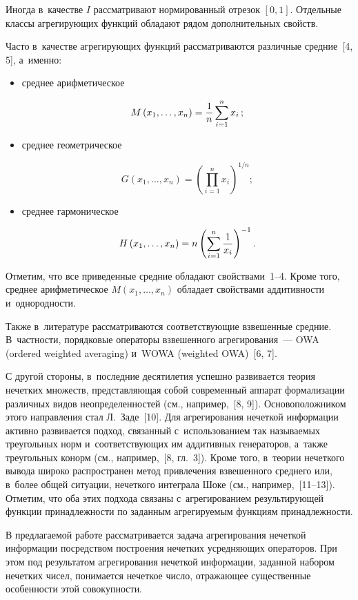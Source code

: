 \begin{multicols}{2}
Иногда в~качестве $I$ рассматривают нормированный отрезок $[0, 1]$. Отдельные 
классы агрегирующих функций обладают рядом дополнительных свойств.


Часто в~качестве агрегирующих функций рассматриваются различные средние~[4, 5], 
а~именно: 
\begin{itemize}

\item среднее арифметическое


\noindent
$$
M\left(x_1,\ldots, x_n\right) = \displaystyle\frac{\displaystyle 1\mathstrut}{\displaystyle n\mathstrut}\sum\limits_{i=1}^nx_i\,;
$$ 
\item
среднее геометрическое 

\noindent
$$
G\left(x_1,\ldots, x_n\right) = \left(\prod\limits_{i=1}^nx_i\right)^{1/n};
$$ 
\item среднее гармоническое 

\noindent
$$
H\left(x_1,\ldots, x_n\right) = n\left(\sum\limits_{i=1}^n \displaystyle\frac{\displaystyle 1\mathstrut}{\displaystyle x_i\mathstrut}\right)^{-1}.
$$  
\end{itemize}
Отметим, что все приведенные средние обладают свойствами~1--4. Кроме того, 
среднее арифметическое $M(x_1,\ldots, x_n)$ обладает  свойствами ад\-ди\-тив\-ности и~од\-но\-род\-ности.


Также в~литературе рассматриваются соответствующие взвешенные средние. 
В~част\-ности,  порядковые операторы взвешенного агрегирования~--- OWA 
(ordered weighted averaging) и~WOWA (weighted OWA)~[6, 7].

С другой стороны, в~последние десятилетия успешно развивается теория нечетких 
множеств, представляющая собой современный аппарат формализации различных видов 
неопределенностей (см., например,~[8, 9]). Основоположником этого направления стал 
Л.~Заде~[10].  Для агрегирования нечеткой информации активно развивается подход, 
связанный с~использованием так называемых треугольных норм и~соответствующих им 
аддитивных генераторов, а~также треугольных конорм (см., например,~[8, гл.~3]).   
Кроме того, в~тео\-рии нечеткого вывода широко распространен метод привлечения 
взвешенного среднего или, в~более общей ситуации, нечеткого интеграла Шоке (см., 
например,~[11--13]). Отметим, что оба этих подхода связаны с~агрегированием 
результирующей функции принадлежности  по заданным агрегируемым функциям 
принадлежности.

В предлагаемой работе рассматривается задача агрегирования нечеткой информации 
посредством построения нечетких усредняющих операторов. При этом под результатом 
агрегирования \mbox{нечеткой} информации, заданной набором нечетких чисел, понимается 
нечеткое чис\-ло, отражающее существенные особенности этой совокупности.


\end{multicols}
